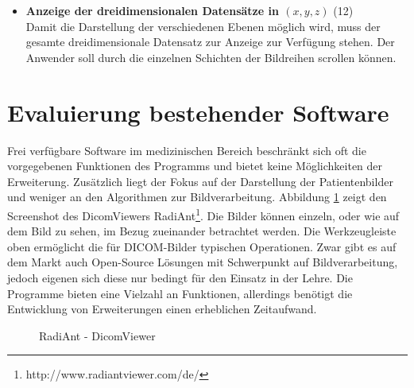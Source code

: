 \begin{itemize}
\item \textbf{Anzeige der dreidimensionalen Datensätze in $(x, y, z)$} (12)\\
	 Damit die Darstellung der verschiedenen Ebenen möglich wird, muss der gesamte dreidimensionale Datensatz zur Anzeige zur Verfügung stehen. Der Anwender soll durch die einzelnen Schichten der Bildreihen scrollen können.
\end{itemize}


\section{Evaluierung bestehender Software}

Frei verfügbare Software im medizinischen Bereich beschränkt sich oft die vorgegebenen Funktionen des Programms und bietet keine Möglichkeiten der Erweiterung. Zusätzlich liegt der Fokus auf der Darstellung der Patientenbilder und weniger an den Algorithmen zur Bildverarbeitung. Abbildung \ref{radiant} zeigt den Screenshot des DicomViewers RadiAnt\footnote{http://www.radiantviewer.com/de/}. Die Bilder können einzeln, oder wie auf dem Bild zu sehen, im Bezug zueinander betrachtet werden. Die Werkzeugleiste oben ermöglicht die für DICOM-Bilder typischen Operationen.
Zwar gibt es auf dem Markt auch Open-Source Lösungen mit Schwerpunkt auf Bildverarbeitung, jedoch eigenen sich diese nur bedingt für den Einsatz in der Lehre. Die Programme bieten eine Vielzahl an Funktionen, allerdings benötigt die Entwicklung von Erweiterungen einen erheblichen Zeitaufwand.
 
\begin{figure}[htbp]
  \vspace{0.5cm}
  \centering
   \caption{RadiAnt - DicomViewer}
  \label{radiant}
  \vspace{0.5cm}
\end{figure}


